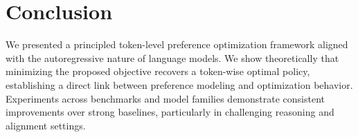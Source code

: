 \documentclass{article}
\theoremstyle{plain}
\theoremstyle{definition}
\theoremstyle{remark}
\begin{document}
\section{Conclusion}
\label{sec:conclusion}
We presented a principled token-level preference optimization framework aligned with the autoregressive nature of language models. We show theoretically that minimizing the proposed objective recovers a token-wise optimal policy, establishing a direct link between preference modeling and optimization behavior. Experiments across benchmarks and model families demonstrate consistent improvements over strong baselines, particularly in challenging reasoning and alignment settings.


\end{document}
